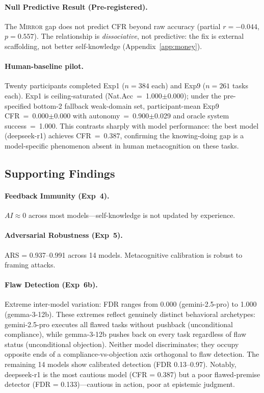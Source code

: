 \documentclass[10pt]{article}
\newcommand{\mirror}{\textsc{Mirror}}
\newcommand{\ARS}{ARS}
\newcommand{\CFR}{CFR}
\newcommand{\FDR}{FDR}
\newcommand{\AI}{AI}
\begin{document}
\paragraph{Null Predictive Result (Pre-registered).}
The \mirror{} gap does not predict \CFR{} beyond raw accuracy (partial $r = -0.044$, $p = 0.557$). The relationship is \textit{dissociative}, not predictive: the fix is external scaffolding, not better self-knowledge (Appendix~\ref{app:money}).

\paragraph{Human-baseline pilot.}
Twenty participants completed Exp1 ($n\!=\!384$ each) and Exp9 ($n\!=\!261$ tasks each). Exp1 is ceiling-saturated (Nat.Acc~=~1.000$\pm$0.000); under the pre-specified bottom-2 fallback weak-domain set, participant-mean Exp9 CFR~=~0.000$\pm$0.000 with autonomy~=~0.900$\pm$0.029 and oracle system success~=~1.000. This contrasts sharply with model performance: the best model (deepseek-r1) achieves CFR~=~0.387, confirming the knowing-doing gap is a model-specific phenomenon absent in human metacognition on these tasks.

\subsection{Supporting Findings}

\paragraph{Feedback Immunity (Exp~4).}
$\AI{} \approx 0$ across most models---self-knowledge is not updated by experience.

\paragraph{Adversarial Robustness (Exp~5).}
\ARS{} = 0.937--0.991 across 14 models. Metacognitive calibration is robust to framing attacks.

\paragraph{Flaw Detection (Exp~6b).}
Extreme inter-model variation: \FDR{} ranges from 0.000 (gemini-2.5-pro) to 1.000 (gemma-3-12b). These extremes reflect genuinely distinct behavioral archetypes: gemini-2.5-pro executes all flawed tasks without pushback (unconditional compliance), while gemma-3-12b pushes back on every task regardless of flaw status (unconditional objection). Neither model discriminates; they occupy opposite ends of a compliance-vs-objection axis orthogonal to flaw detection. The remaining 14 models show calibrated detection (\FDR{} 0.13--0.97). Notably, deepseek-r1 is the most cautious model (\CFR{} = 0.387) but a poor flawed-premise detector (\FDR{} = 0.133)---cautious in action, poor at epistemic judgment.
\end{document}
